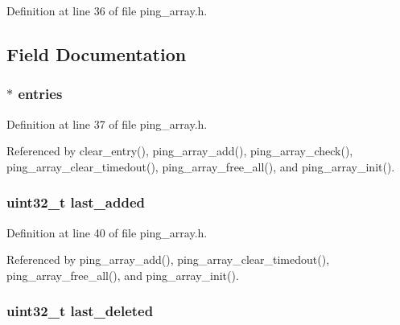 Definition at line 36 of file ping\+\_\+array.\+h.



\subsection{Field Documentation}
\hypertarget{struct_ping___array_a313b705ae8f0db8c02b2847b315ca1b1}{
\subsubsection[{entries}]{$\ast$ entries}}\label{struct_ping___array_a313b705ae8f0db8c02b2847b315ca1b1}


Definition at line 37 of file ping\+\_\+array.\+h.



Referenced by clear\+\_\+entry(), ping\+\_\+array\+\_\+add(), ping\+\_\+array\+\_\+check(), ping\+\_\+array\+\_\+clear\+\_\+timedout(), ping\+\_\+array\+\_\+free\+\_\+all(), and ping\+\_\+array\+\_\+init().

\hypertarget{struct_ping___array_a812ff28187c193e9a813628c36257df8}{
\subsubsection[{last\+\_\+added}]{\setlength{\rightskip}{0pt plus 5cm}uint32\+\_\+t last\+\_\+added}}\label{struct_ping___array_a812ff28187c193e9a813628c36257df8}


Definition at line 40 of file ping\+\_\+array.\+h.



Referenced by ping\+\_\+array\+\_\+add(), ping\+\_\+array\+\_\+clear\+\_\+timedout(), ping\+\_\+array\+\_\+free\+\_\+all(), and ping\+\_\+array\+\_\+init().

\hypertarget{struct_ping___array_ab3011676335a878a2c94492a37a63c3f}{
\subsubsection[{last\+\_\+deleted}]{\setlength{\rightskip}{0pt plus 5cm}uint32\+\_\+t last\+\_\+deleted}}\label{struct_ping___array_ab3011676335a878a2c94492a37a63c3f}


